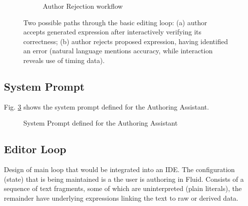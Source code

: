 \begin{figure}[ht]
\begin{subfigure}{0.50\linewidth}
        \caption{Author Rejection workflow}
        \label{fig:dataflow-error}
    \end{subfigure}
    \caption{Two possible paths through the basic editing loop: (a) author accepts generated expression after
    interactively verifying its correctness; (b) author rejects proposed expression, having identified an
    error (natural language mentions accuracy, while interaction reveals use of timing data).}
    \label{fig:overall-architecture}
\end{figure}


\subsection{System Prompt}
\label{subsec:system-prompt}
Fig. \ref{fig:system-prompt} shows the system prompt defined for the Authoring Assistant.

\begin{figure}[h]
    \centering
    \begin{tcolorbox}[colback=gray!10, colframe=gray!50, boxrule=0.5pt, arc=2pt,
        left=6pt, right=6pt, top=4pt, bottom=4pt]
    \end{tcolorbox}
    \vspace{-0.5em}
    \caption{System Prompt defined for the Authoring Assistant}
    \label{fig:system-prompt}
\end{figure}


\subsection{Editor Loop}
\label{subsec:editor-loop}
Design of main loop that would be integrated into an IDE. The configuration (state) that is being maintained
is a  the user is authoring in Fluid. Consists of a sequence of text fragments, some of which
are uninterpreted (plain literals), the remainder have underlying expressions linking the text to raw or derived
data.

